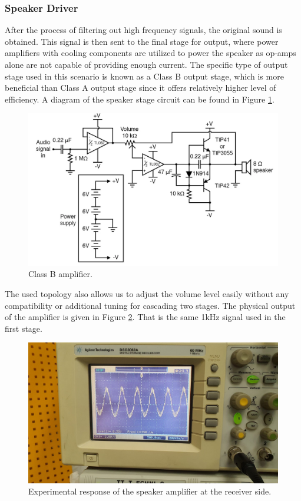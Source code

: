 \documentclass[a4paper,10pt]{IEEEtran}
\begin{document}
\subsubsection{Speaker Driver}
After the process of filtering out high frequency signals, the original sound is obtained. This signal is then sent to the final stage for output, where power amplifiers with cooling components are utilized to power the speaker as op-amps alone are not capable of providing enough current. The specific type of output stage used in this scenario is known as a Class B output stage, which is more beneficial than Class A output stage since it offers relatively higher level of efficiency. A diagram of the speaker stage circuit can be found in Figure \ref{classb}.
\begin{figure}[htbp!]
    \centering
    \includegraphics[width = 1\linewidth]{classb.png}
    \caption{Class B amplifier. }
    \label{classb}
\end{figure} 
The used topology also allows us to adjust the volume level easily without any compatibility or additional tuning for cascading two stages. The physical output of the amplifier is given in Figure \ref{speaker_osc}. That is the same 1kHz signal used in the first stage.
\begin{figure}[htbp!]
    \centering
    \includegraphics[width = 1\linewidth]{speaker_amplifier.jpeg}
    \caption{Experimental response of the speaker amplifier at the receiver side. }
    \label{speaker_osc}
\end{figure} 
\end{document}
